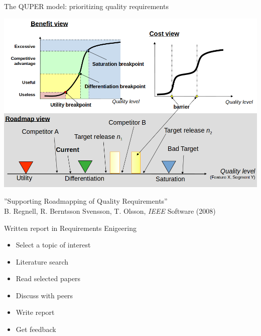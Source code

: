 \documentclass{simpleslides}
\begin{document}
\begin{frame}[fragile]{The QUPER model: prioritizing quality requirements}
\begin{center}
\includegraphics[width=1.0\textwidth]{img/quper}
\end{center}
{\footnotesize ''Supporting Roadmapping of Quality Requirements'' 
\\ B. Regnell, R. Berntsson Svensson, T. Olsson, \emph{IEEE} Software (2008)}
\end{frame}
  

\begin{frame}[fragile]{Written report in Requirements Enigeering}
\begin{itemize}
\item Select a topic of interest
\item Literature search
\item Read selected papers
\item Discuss with peers
\item Write report
\item Get feedback
\end{itemize}
\end{frame}
\end{document}
